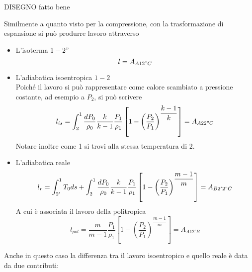 \begin{adjustwidth}{2in}{}
	DISEGNO fatto bene
	
	Similmente a quanto visto per la compressione, con la trasformazione di espansione si può produrre lavoro attraverso
	\begin{itemize}
		\item L'isoterma $1-2"$
		\[l = A_{A12"C}\]
		\item L'adiabatica isoentropica $1-2$\\
		Poiché il lavoro si può rappresentare come calore scambiato a pressione costante, ad esempio a $P_2$, si può scrivere
		\[l_{is} = \int_{2}^{1} \dfrac{dP_0}{\rho_0} \dfrac{k}{k-1}\dfrac{P_1}{\rho_1}\left[1-\left(\dfrac{P_2}{P_1}\right)^{\dfrac{k-1}{k}}\right] = A_{A22"C}\]
		Notare inoltre come 1 si trovi alla stessa temperatura di 2.
		\item L'adiabatica reale 
		\[l_r = \int_{2'}^{1}T_0ds + \int_{2}^{1}\dfrac{dP_0}{\rho_0} \dfrac{k}{k-1}\dfrac{P_1}{\rho_1}\left[1-\left(\dfrac{P_2}{P_1}\right)^{\dfrac{m-1}{m}}\right] = A_{B2'2"C}\]
		A cui è associata il lavoro della politropica 
		\[l_{pol} = \dfrac{m}{m-1}\dfrac{P_1}{\rho_1}\left[1-\left(\dfrac{P_2}{P_1}\right)^{\dfrac{m-1}{m}}\right] = A_{A12'B}\]
	\end{itemize}
	Anche in questo caso la differenza tra il lavoro isoentropico e quello reale è data da due contributi:
	

\end{adjustwidth}
